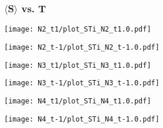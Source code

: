\documentclass{beamer}
\begin{document}
\begin{frame}\frametitle{$\langle$S$\rangle$ vs. T}
	\begin{center}
		\begin{minipage}[t]{0.44\textwidth}
			\texttt{[image: N2\_t1/plot\_STi\_N2\_t1.0.pdf]}
		\end{minipage}
		\begin{minipage}[t]{0.44\textwidth}
			\texttt{[image: N2\_t-1/plot\_STi\_N2\_t-1.0.pdf]}
		\end{minipage}
		
		\begin{minipage}[t]{0.44\textwidth}
			\texttt{[image: N3\_t1/plot\_STi\_N3\_t1.0.pdf]}
		\end{minipage}
		\begin{minipage}[t]{0.44\textwidth}
			\texttt{[image: N3\_t-1/plot\_STi\_N3\_t-1.0.pdf]}
		\end{minipage}
		
		\begin{minipage}[t]{0.44\textwidth}
			\texttt{[image: N4\_t1/plot\_STi\_N4\_t1.0.pdf]}
		\end{minipage}
		\begin{minipage}[t]{0.44\textwidth}
			\texttt{[image: N4\_t-1/plot\_STi\_N4\_t-1.0.pdf]}
		\end{minipage}
	\end{center}	
\end{frame}
\end{document}
